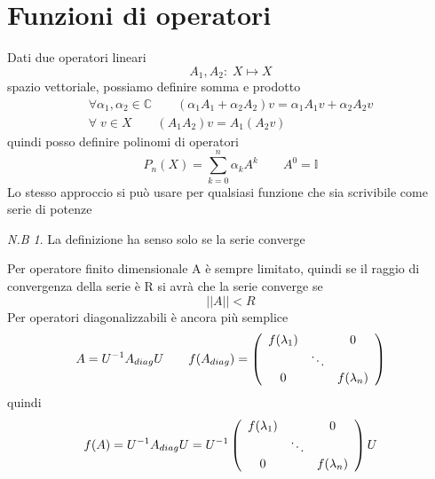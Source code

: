 \documentclass[a4paper,11pt]{report}
\theoremstyle{remark}
\newtheorem*{nb}{N.B}
\theoremstyle{definition}
\newcommand{\C}{\mathbb{C}}
\begin{document}
\section{Funzioni di operatori}

Dati due operatori lineari
\begin{equation*}
	A_1,A_2: \; X \mapsto X
\end{equation*}
spazio vettoriale, possiamo definire somma e prodotto
\begin{gather*}
	\forall \alpha_1,\alpha_2 \in \C \qquad (\alpha_1 A_1+\alpha_2 A_2)v = \alpha_1A_1v + \alpha_2 A_2v \\
	\forall \; v \in X \qquad (A_1 A_2) v = A_1(A_2v)
\end{gather*}
quindi posso definire polinomi di operatori
\begin{equation*}
	P_n(X) = \sum_{k=0}^n \alpha_kA^k \qquad A^0 = \mathbb{I}
\end{equation*}
Lo stesso approccio si può usare per qualsiasi funzione che sia scrivibile come serie di potenze
\begin{nb}
	La definizione ha senso solo se la serie converge
\end{nb}
Per operatore finito dimensionale A è sempre limitato, quindi se il raggio di convergenza della serie è R si avrà che la serie converge se 
\begin{equation*}
	||A||< R
\end{equation*}
Per operatori diagonalizzabili è ancora più semplice
\begin{equation*}
	A = U^{-1}A_{diag}U \qquad f(A_{diag}) = \left(\begin{array}[]{ccc}
		f(\lambda_1) && 0 \\
		& \ddots & \\
		0 && f(\lambda_n)
	\end{array}\right)
\end{equation*}
quindi
\begin{equation*}
	f(A) = U^{-1}A_{diag}U = U^{-1} \left(\begin{array}[]{ccc}
		f(\lambda_1) && 0 \\
		& \ddots & \\
		0 && f(\lambda_n)
	\end{array}\right)U
\end{equation*}
\end{document}
